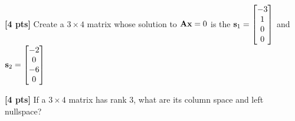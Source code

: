 \documentclass[11pt,addpoints,answers]{exam}
\numberwithin{equation}{section} %
\numberwithin{figure}{section} %
\numberwithin{table}{section} %
\begin{document}
\begin{questions}
\question \textbf{[4 pts]} Create a $3 \times 4$ matrix whose solution to $\mathbf{A} \mathbf{x} = 0$ is the $\mathbf{s}_1=\begin{bmatrix}
         -3 \\
         1 \\
         0 \\
         0
        \end{bmatrix}$ and $\mathbf{s}_2=\begin{bmatrix}
         -2 \\
         0 \\
         -6 \\
         0
        \end{bmatrix}$

    \begin{tcolorbox}[fit,height=3cm, width=\textwidth, blank, borderline={0.5pt}{-2pt},halign=center, valign=center, nobeforeafter]
    \end{tcolorbox}


\question \textbf{[4 pts]} If a $3{\times}4$ matrix has rank $3$, what are its column space and left nullspace?

    \begin{tcolorbox}[fit,height=3cm, width=\textwidth, blank, borderline={0.5pt}{-2pt},halign=center, valign=center, nobeforeafter]
    \end{tcolorbox}


\end{questions}
\clearpage
\end{document}
